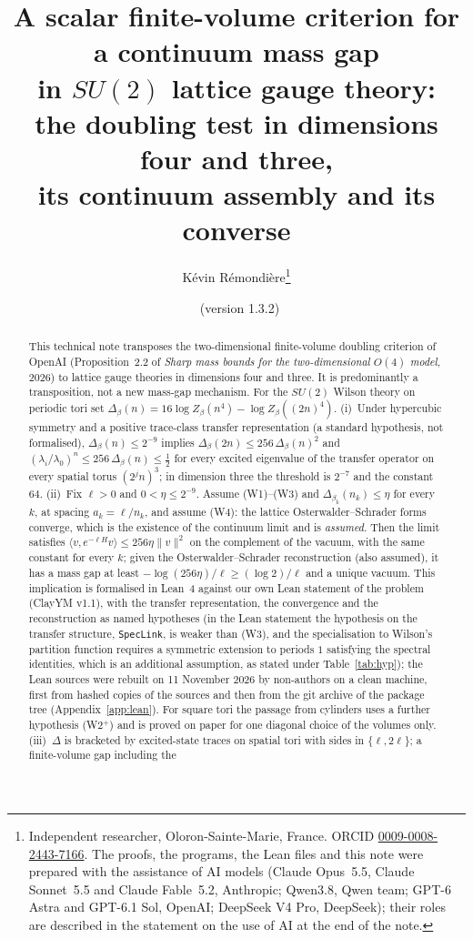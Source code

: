 \documentclass[11pt,a4paper]{article}
\title{A scalar finite-volume criterion for a continuum mass gap\\ in $SU(2)$ lattice gauge theory:\\ the doubling test in dimensions four and three,\\ its continuum assembly and its converse}
\author{K\'evin R\'emondi\`ere\thanks{Independent researcher, Oloron-Sainte-Marie, France. ORCID
\href{https://orcid.org/0009-0008-2443-7166}{0009-0008-2443-7166}. The proofs, the programs, the Lean files and this note were
prepared with the assistance of AI models (Claude Opus~5.5, Claude Sonnet~5.5 and Claude Fable~5.2, Anthropic; Qwen3.8, Qwen team; GPT-6 Astra and GPT-6.1 Sol, OpenAI; DeepSeek V4 Pro, DeepSeek); their roles are described in the
statement on the use of AI at the end of the note.}}
\date{\VDATE\ (version 1.3.2)}
\theoremstyle{plain}
\theoremstyle{definition}
\theoremstyle{remark}
\numberwithin{equation}{section}
\begin{document}
\maketitle

\begin{abstract}
This technical note transposes the two-dimensional finite-volume doubling criterion of OpenAI (Proposition~2.2 of \emph{Sharp mass bounds
for the two-dimensional $O(4)$ model}, 2026) to lattice gauge theories in dimensions four and three. It is predominantly a transposition,
not a new mass-gap mechanism. For the $SU(2)$ Wilson theory on periodic tori set
$\Delta_\beta(n)=16\log Z_\beta(n^4)-\log Z_\beta((2n)^4)$.
(i)~Under hypercubic symmetry and a positive trace-class transfer representation (a standard hypothesis, not formalised),
$\Delta_\beta(n)\le2^{-9}$ implies $\Delta_\beta(2n)\le256\,\Delta_\beta(n)^2$ and
$(\lambda_i/\lambda_0)^n\le256\,\Delta_\beta(n)\le\frac12$ for every excited eigenvalue of the transfer operator on every spatial torus
$(2^jn)^3$; in dimension three the threshold is $2^{-7}$ and the constant $64$.
(ii)~Fix $\ell>0$ and $0<\eta\le2^{-9}$. Assume (W1)--(W3) and $\Delta_{\beta_k}(n_k)\le\eta$ for every $k$, at spacing $a_k=\ell/n_k$, and assume (W4): the lattice
Osterwalder--Schrader forms converge, which is the existence of the continuum limit and is \emph{assumed}. Then the limit satisfies
$\langle v,e^{-\ell H}v\rangle\le256\eta\|v\|^2$ on the complement of the vacuum, with the same constant for every $k$; given the
Osterwalder--Schrader reconstruction (also assumed), it has a mass gap at least $-\log(256\eta)/\ell\ge(\log2)/\ell$ and a unique vacuum.
This implication is formalised in Lean~4 against our own Lean statement of the problem (ClayYM v1.1), with the transfer representation, the
convergence and the reconstruction as named hypotheses (in the Lean statement the hypothesis on the transfer structure, \texttt{SpecLink}, is weaker than (W3), and the specialisation to Wilson's partition function requires a symmetric extension to periods $1$ satisfying the spectral identities, which is an additional assumption, as stated under Table~\ref{tab:hyp}); the Lean sources were rebuilt on 11 November 2026 by non-authors on a clean
machine, first from hashed copies of the sources and then from the git archive of the package tree (Appendix~\ref{app:lean}). For square tori the passage from cylinders uses a further hypothesis (W2$^+$) and is proved on paper for one
diagonal choice of the volumes only.
(iii)~$\Delta$ is bracketed by excited-state traces on spatial tori with sides in $\{\ell,2\ell\}$; a finite-volume gap including the

\end{abstract}
\end{document}
